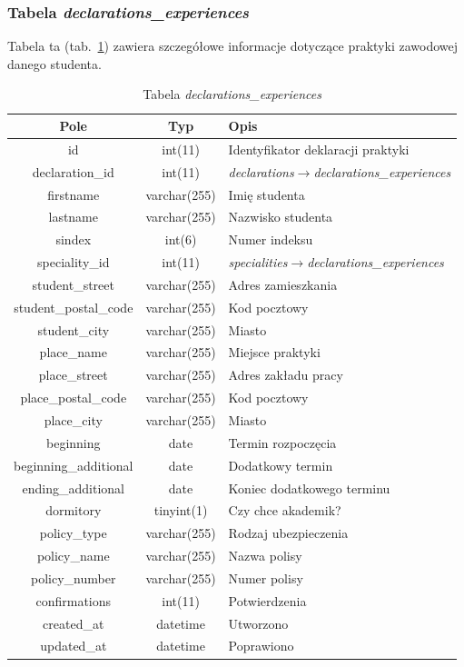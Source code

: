 \documentclass[a4paper,12pt,oneside]{report}
\begin{document}
\newpage
\subsubsection{Tabela \emph{declarations\_experiences}}
\label{subsub:declarations_experiences}
Tabela ta (tab.~\ref{tab:declarations_experiences}) zawiera szczegółowe informacje dotyczące praktyki zawodowej danego studenta.

\begin{table}[h]
  \centering
  \begin{tabular}{|c|c|l|}\hline
  Pole & Typ & Opis \\\hline
  id   & int(11)   & Identyfikator deklaracji praktyki\\
  declaration\_id       & int(11)      & \emph{declarations}$\to$\emph{declarations\_experiences}\\
  firstname             & varchar(255) & Imię studenta \\
  lastname              & varchar(255) & Nazwisko studenta \\
  sindex                & int(6)       & Numer indeksu \\
  speciality\_id        & int(11)      & \emph{specialities}$\to$\emph{declarations\_experiences}\\
  student\_street       & varchar(255) & Adres zamieszkania \\
  student\_postal\_code & varchar(255) & Kod pocztowy\\
  student\_city         & varchar(255) & Miasto \\
  place\_name           & varchar(255) & Miejsce praktyki \\
  place\_street         & varchar(255) & Adres zakładu pracy \\
  place\_postal\_code   & varchar(255) & Kod pocztowy\\
  place\_city           & varchar(255) & Miasto \\
  beginning             & date         & Termin rozpoczęcia \\
  beginning\_additional & date         & Dodatkowy termin \\
  ending\_additional    & date         & Koniec dodatkowego terminu \\
  dormitory             & tinyint(1)   & Czy chce akademik? \\
  policy\_type          & varchar(255) & Rodzaj ubezpieczenia \\
  policy\_name          & varchar(255) & Nazwa polisy \\
  policy\_number        & varchar(255) & Numer polisy \\
  confirmations         & int(11)      & Potwierdzenia \\
  created\_at           & datetime     & Utworzono \\
  updated\_at           & datetime     & Poprawiono \\\hline
  \end{tabular}
  \caption{Tabela \emph{declarations\_experiences}\label{tab:declarations_experiences}}
\end{table}
\end{document}
